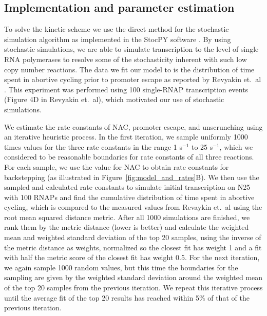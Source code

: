 \subsection{Implementation and parameter estimation}
To solve the kinetic scheme we use the direct method for the stochastic
simulation algorithm \cite{gillespie_exact_1977} as implemented in the StocPY
software \cite{maarleveld_stochpy:_2013}. By using stochastic simulations, we
are able to simulate transcription to the level of single RNA polymerases to
resolve some of the stochasticity inherent with such low copy number
reactions. The data we fit our model to is the distribution of time spent in
abortive cycling prior to promoter escape as reported by Revyakin et.\ al
\cite{revyakin_abortive_2006}. This experiment was performed using 100
single-RNAP transcription events (Figure 4D in Revyakin et.\ al), which
motivated our use of stochastic simulations.

We estimate the rate constants of NAC, promoter escape, and unscrunching using an
iterative heuristic process. In the first iteration, we sample uniformly 1000
times values for the three rate constants in the range 1 s$^{-1}$ to 25
s$^{-1}$, which we considered to be reasonable boundaries for rate constants
of all three reactions. For each sample, we use the value for NAC to obtain
rate constants for backstepping (as illustrated in
Figure~\ref{fig:model_and_rates}B). We then use the sampled and calculated
rate constants to simulate initial transcription on N25 with 100 RNAPs and
find the cumulative distribution of time spent in abortive cycling, which is
compared to the measured values from Revaykin et.\ al
\cite{revyakin_abortive_2006} using the root mean squared distance metric.
After all 1000 simulations are finished, we rank them by the metric distance (lower is
better) and calculate the weighted mean and weighted standard deviation of the
top 20 samples, using the inverse of the metric distance as weights, normalized
so the closest fit has weight 1 and a fit with half the metric score of the
closest fit has weight 0.5. For the next iteration, we again sample 1000
random values, but this time the boundaries for the sampling are
given by the weighted standard deviation around the weighted mean of the top
20 samples from the previous iteration. We repeat this iterative process
until the average fit of the top 20 results has reached within 5\% of that of
the previous iteration.

